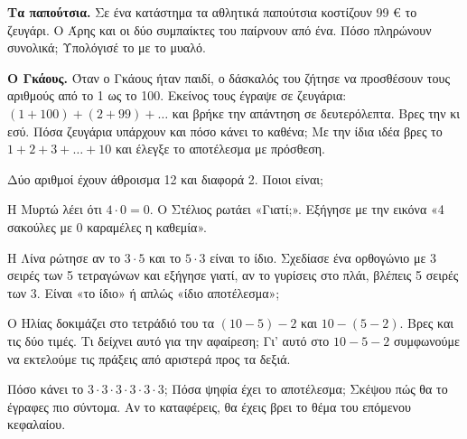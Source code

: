\ex \textbf{Τα παπούτσια.} Σε ένα κατάστημα τα αθλητικά παπούτσια κοστίζουν 99 € το ζευγάρι. Ο Άρης και οι δύο συμπαίκτες του παίρνουν από ένα. Πόσο πληρώνουν συνολικά; Υπολόγισέ το με το μυαλό.


\ex \textbf{Ο Γκάους.} Όταν ο Γκάους ήταν παιδί, ο δάσκαλός του ζήτησε να προσθέσουν τους αριθμούς από το 1 ως το 100. Εκείνος τους έγραψε σε ζευγάρια: $(1+100)+(2+99)+\dots$ και βρήκε την απάντηση σε δευτερόλεπτα. Βρες την κι εσύ. Πόσα ζευγάρια υπάρχουν και πόσο κάνει το καθένα; Με την ίδια ιδέα βρες το $1+2+3+\dots+10$ και έλεγξε το αποτέλεσμα με πρόσθεση.

\ex Δύο αριθμοί έχουν άθροισμα 12 και διαφορά 2. Ποιοι είναι;

\ex Η Μυρτώ λέει ότι $4\cdot 0=0$. Ο Στέλιος ρωτάει «Γιατί;». Εξήγησε με την εικόνα «4 σακούλες με 0 καραμέλες η καθεμία».

\ex Η Λίνα ρώτησε αν το $3\cdot 5$ και το $5\cdot 3$ είναι το ίδιο. Σχεδίασε ένα ορθογώνιο με 3 σειρές των 5 τετραγώνων και εξήγησε γιατί, αν το γυρίσεις στο πλάι, βλέπεις 5 σειρές των 3. Είναι «το ίδιο» ή απλώς «ίδιο αποτέλεσμα»;

\ex Ο Ηλίας δοκιμάζει στο τετράδιό του τα $(10-5)-2$ και $10-(5-2)$. Βρες και τις δύο τιμές. Τι δείχνει αυτό για την αφαίρεση; Γι' αυτό στο $10-5-2$ συμφωνούμε να εκτελούμε τις πράξεις από αριστερά προς τα δεξιά.

\ex Πόσο κάνει το $3\cdot 3\cdot 3\cdot 3\cdot 3\cdot 3$; Πόσα ψηφία έχει το αποτέλεσμα; Σκέψου πώς θα το έγραφες πιο σύντομα. Αν το καταφέρεις, θα έχεις βρει το θέμα του επόμενου κεφαλαίου.
